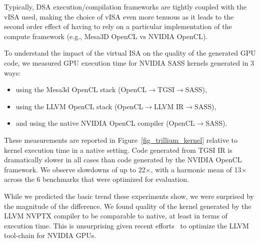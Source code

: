 Typically, DSA execution/compilation frameworks are tightly coupled with the
vISA used, making the choice of vISA even more tenuous as it leads to the
second order effect of having to rely on a particular implementation of the
compute framework (e.g., Mesa3D OpenCL vs NVIDIA OpenCL).

To understand the impact of the virtual ISA on the quality of the generated GPU code, we measured GPU execution time for NVIDIA SASS kernels generated in 3 ways:
\begin{itemize}[nosep, topsep=0em, leftmargin=1em,labelwidth=*,align=left]
\item using the Mesa3d OpenCL stack (OpenCL$\rightarrow{}$TGSI$\rightarrow{}$SASS),
\item using the LLVM OpenCL stack (OpenCL$\rightarrow{}$LLVM IR$\rightarrow{}$SASS),
\item and using the native NVIDIA OpenCL compiler (OpenCL$\rightarrow{}$SASS).
\end{itemize}

These measurements are reported in Figure~\ref{fig_trillium_kernel}
relative to kernel execution time in a native setting. Code generated from TGSI IR is dramatically slower in all cases than code generated by the NVIDIA OpenCL framework. We observe slowdowns of up to 22$\times$, with a harmonic mean of 13$\times$ across the 6 benchmarks that were optimized for evaluation.

While we predicted the basic trend these experiments show, we were surprised
by the magnitude of the difference. We found quality of the kernel generated
by the LLVM NVPTX compiler to be comparable to native, at least in terms of
execution time. This is unsurprising given recent efforts~\cite{gpucc} to
optimize the LLVM tool-chain for NVIDIA GPUs.

